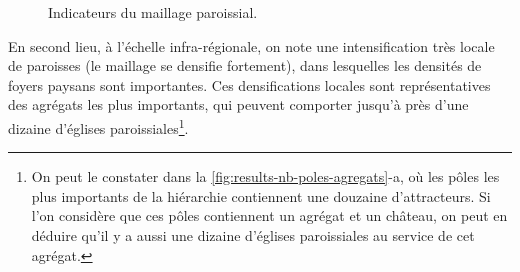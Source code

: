 \begin{figure}[H]
	\centering
	\hspace{5pt}
	\hspace{1em}
	\caption{Indicateurs du maillage paroissial.}
	\label{fig:results-paroisses}
\end{figure}

En second lieu, à l'échelle infra-régionale, on note une intensification très locale de paroisses (le maillage se densifie fortement), dans lesquelles les densités de foyers paysans sont importantes.
Ces densifications locales sont représentatives des agrégats les plus importants, qui peuvent comporter jusqu'à près d'une dizaine d'églises paroissiales\footnote{
	On peut le constater dans la \cref{fig:results-nb-poles-agregats}-a, où les pôles les plus importants de la hiérarchie contiennent une douzaine d'attracteurs. Si l'on considère que ces pôles contiennent un agrégat et un château, on peut en déduire qu'il y a aussi une dizaine d'églises paroissiales au service de cet agrégat.
}.

